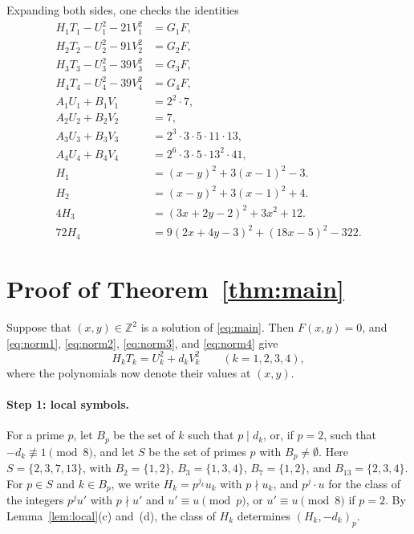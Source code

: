 \documentclass[11pt]{article}
\newcommand{\Z}{\mathbb{Z}}
\begin{document}
Expanding both sides, one checks the identities
\begin{align}
H_{1}T_{1}-U_{1}^2-21V_{1}^2&=G_{1}F,\label{eq:norm1}\\
H_{2}T_{2}-U_{2}^2-91V_{2}^2&=G_{2}F,\label{eq:norm2}\\
H_{3}T_{3}-U_{3}^2-39V_{3}^2&=G_{3}F,\label{eq:norm3}\\
H_{4}T_{4}-U_{4}^2-39V_{4}^2&=G_{4}F,\label{eq:norm4}\\
A_{1}U_{1}+B_{1}V_{1}&=2^{2}\cdot 7,\label{eq:bez1}\\
A_{2}U_{2}+B_{2}V_{2}&=7,\label{eq:bez2}\\
A_{3}U_{3}+B_{3}V_{3}&=2^{3}\cdot 3\cdot 5\cdot 11\cdot 13,\label{eq:bez3}\\
A_{4}U_{4}+B_{4}V_{4}&=2^{6}\cdot 3\cdot 5\cdot 13^{2}\cdot 41,\label{eq:bez4}\\
H_{1}&=(x-y)^2+3(x-1)^2-3.\label{eq:sign1}\\
H_{2}&=(x-y)^2+3(x-1)^2+4.\label{eq:sign2}\\
4H_{3}&=(3x+2y-2)^2+3x^2+12.\label{eq:sign3}\\
72H_{4}&=9(2x+4y-3)^2+(18x-5)^2-322.\label{eq:sign4}
\end{align}

\section{Proof of Theorem~\ref{thm:main}}

Suppose that $(x,y)\in\Z^2$ is a solution of \eqref{eq:main}. Then $F(x,y)=0$, and \eqref{eq:norm1}, \eqref{eq:norm2}, \eqref{eq:norm3}, and \eqref{eq:norm4} give
\begin{equation}\label{eq:HT}
H_kT_k=U_k^2+d_kV_k^2\qquad(k=1,2,3,4),
\end{equation}
where the polynomials now denote their values at $(x,y)$.

\paragraph{Step 1: local symbols.} For a prime $p$, let $B_p$ be the set of $k$ such that $p\mid d_k$, or, if $p=2$, such that $-d_k\not\equiv1\pmod8$, and let $S$ be the set of primes $p$ with $B_p\neq\emptyset$. Here $S=\{2,3,7,13\}$, with $B_{2}=\{1,2\}$, $B_{3}=\{1,3,4\}$, $B_{7}=\{1,2\}$, and $B_{13}=\{2,3,4\}$. For $p\in S$ and $k\in B_p$, we write $H_k=p^{j_k}u_k$ with $p\nmid u_k$, and $p^j\cdot u$ for the class of the integers $p^ju'$ with $p\nmid u'$ and $u'\equiv u\pmod p$, or $u'\equiv u\pmod 8$ if $p=2$. By Lemma~\ref{lem:local}(c) and~(d), the class of $H_k$ determines $(H_k,-d_k)_p$.
\end{document}
